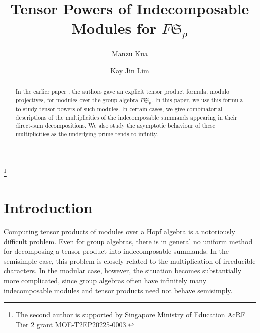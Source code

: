 \documentclass[12pt,reqno]{amsart}
\newcommand{\sym}[1]{\mathfrak{S}_{#1}}
\newcommand{\F}{{F}}
\theoremstyle{definition}
\numberwithin{equation}{section}
\begin{document}
\title{Tensor Powers of Indecomposable Modules for $\F \sym{p}$}

\author{Manzu Kua}
\address[M. Kua]{Division of Mathematical Sciences, Nanyang Technological University, SPMS-04-01, 21 Nanyang Link, Singapore 637371.}

\author{Kay Jin Lim}
\address[K. J. Lim]{Division of Mathematical Sciences, Nanyang Technological University, SPMS-04-01, 21 Nanyang Link, Singapore 637371.}

\begin{abstract} In the earlier paper \cite{kualim1}, the authors gave an explicit tensor product formula, modulo projectives, for modules over the group algebra $\F\sym{p}$. In this paper, we use this formula to study tensor powers of such modules. In certain cases, we give combinatorial descriptions of the multiplicities of the indecomposable summands appearing in their direct-sum decompositions. We also study the asymptotic behaviour of these multiplicities as the underlying prime tends to infinity.

\end{abstract}


\thanks{The second author is supported by Singapore Ministry of Education AcRF Tier 2 grant MOE-T2EP20225-0003.}


\maketitle

\section{Introduction} 

Computing tensor products of modules over a Hopf algebra is a notoriously difficult problem. Even for group algebras, there is in general no uniform method for decomposing a tensor product into indecomposable summands. In the semisimple case, this problem is closely related to the multiplication of irreducible characters. In the modular case, however, the situation becomes substantially more complicated, since group algebras often have infinitely many indecomposable modules and tensor products need not behave semisimply.
\end{document}
